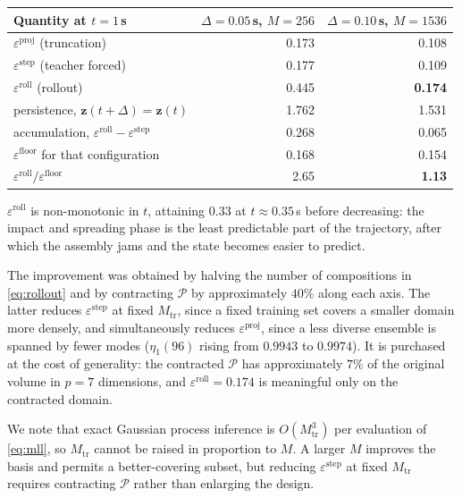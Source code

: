 \documentclass[11pt]{article}
\newcommand{\bs}[1]{\boldsymbol{#1}}
\begin{document}
\begin{center}
\begin{tabular}{lrr}
\toprule
Quantity at $t = 1$\,s & $\Delta = 0.05$\,s, $M = 256$ & $\Delta = 0.10$\,s, $M = 1536$ \\
\midrule
$\varepsilon^{\text{proj}}$ (truncation) & 0.173 & 0.108 \\
$\varepsilon^{\text{step}}$ (teacher forced) & 0.177 & 0.109 \\
$\varepsilon^{\text{roll}}$ (rollout) & 0.445 & \textbf{0.174} \\
persistence, $\bs{z}(t+\Delta) = \bs{z}(t)$ & 1.762 & 1.531 \\
accumulation, $\varepsilon^{\text{roll}} - \varepsilon^{\text{step}}$ & 0.268 & 0.065 \\
$\varepsilon^{\text{floor}}$ for that configuration & 0.168 & 0.154 \\
$\varepsilon^{\text{roll}} / \varepsilon^{\text{floor}}$ & 2.65 & \textbf{1.13} \\
\bottomrule
\end{tabular}
\end{center}

$\varepsilon^{\text{roll}}$ is non-monotonic in $t$, attaining $0.33$ at $t \approx 0.35$\,s before
decreasing: the impact and spreading phase is the least predictable part of the trajectory, after
which the assembly jams and the state becomes easier to predict.

The improvement was obtained by halving the number of compositions in \eqref{eq:rollout} and by
contracting $\mathcal{P}$ by approximately $40\%$ along each axis. The latter reduces
$\varepsilon^{\text{step}}$ at fixed $M_{\mathrm{tr}}$, since a fixed training set covers a smaller
domain more densely, and simultaneously reduces $\varepsilon^{\text{proj}}$, since a less diverse
ensemble is spanned by fewer modes ($\eta_1(96)$ rising from $0.9943$ to $0.9974$). It is
purchased at the cost of generality: the contracted $\mathcal{P}$ has approximately $7\%$ of the
original volume in $p = 7$ dimensions, and $\varepsilon^{\text{roll}} = 0.174$ is meaningful only on
the contracted domain.

We note that exact Gaussian process inference is $O(M_{\mathrm{tr}}^3)$ per evaluation of
\eqref{eq:mll}, so $M_{\mathrm{tr}}$ cannot be raised in proportion to $M$. A larger $M$ improves
the basis and permits a better-covering subset, but reducing $\varepsilon^{\text{step}}$ at fixed
$M_{\mathrm{tr}}$ requires contracting $\mathcal{P}$ rather than enlarging the design.
\end{document}
